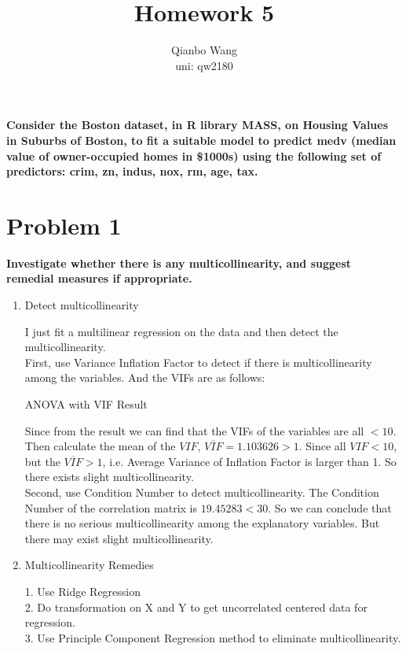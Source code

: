 \documentclass[10pt,letterpaper]{article}
\title{\textbf {Homework 5}}
\author{{Qianbo Wang}\\{uni: qw2180}}
\date{}
\begin{document}
\maketitle
\thispagestyle{fancy}
\vspace{-2em}

\large{\textbf{Consider the Boston dataset, in R library MASS, on Housing Values in Suburbs of Boston, to fit a suitable model to predict medv (median value of owner-occupied homes in \$1000s) using the following set of predictors: crim, zn, indus, nox, rm, age, tax.}}\\
\section*{Problem 1}
\textbf{Investigate whether there is any multicollinearity, and suggest remedial measures if appropriate.}\\
\begin{enumerate}[leftmargin=0cm,itemindent=.5cm,labelwidth=\itemindent,labelsep=0cm,align=left]
\item[\textbullet] Detect multicollinearity

I just fit a multilinear regression on the data and then detect the multicollinearity.\\
First, use Variance Inflation Factor to detect if there is multicollinearity among the variables. And the VIFs are as follows:
\begin{center}
ANOVA with VIF Result

\end{center} 

Since from the result we can find that the VIFs of the variables are all $<10$. Then calculate the mean of the $VIF$, $\overline{VIF} = 1.103626>1$. 
Since all $VIF<10$, but the  $\overline{VIF}>1$, i.e. Average Variance of Inflation Factor is larger than 1. So there exists slight multicollinearity.\\

Second, use Condition Number to detect multicollinearity. The Condition Number of the correlation matrix is $19.45283<30$. So we can conclude that there is no serious multicollinearity among the explanatory variables. But there may exist slight multicollinearity. 

\item[\textbullet] Multicollinearity Remedies

1. Use Ridge Regression \\
2. Do transformation on X and Y to get uncorrelated centered data for regression. \\
3. Use Principle Component Regression method to eliminate multicollinearity.
\end{enumerate}
\end{document}

